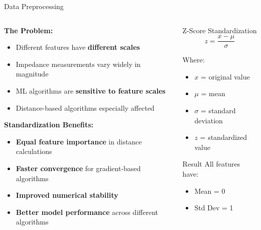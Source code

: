 \documentclass[aspectratio=169]{beamer}
\begin{document}
\begin{frame}{Data Preprocessing}
\begin{columns}
\begin{column}{0.6\textwidth}
\textbf{The Problem:}
\begin{itemize}
\item Different features have \textbf{different scales}
\item Impedance measurements vary widely in magnitude
\item ML algorithms are \textbf{sensitive to feature scales}
\item Distance-based algorithms especially affected
\end{itemize}

\vspace{0.3cm}
\textbf{Standardization Benefits:}
\begin{itemize}
\item \textbf{Equal feature importance} in distance calculations
\item \textbf{Faster convergence} for gradient-based algorithms
\item \textbf{Improved numerical stability}
\item \textbf{Better model performance} across different algorithms
\end{itemize}
\end{column}
\begin{column}{0.4\textwidth}
\begin{block}{Z-Score Standardization}
$$z = \frac{x - \mu}{\sigma}$$

Where:
\begin{itemize}
\item $x$ = original value
\item $\mu$ = mean
\item $\sigma$ = standard deviation
\item $z$ = standardized value
\end{itemize}
\end{block}

\vspace{0.2cm}
\begin{alertblock}{Result}
All features have:
\begin{itemize}
\item Mean = 0
\item Std Dev = 1
\end{itemize}
\end{alertblock}
\end{column}
\end{columns}
\end{frame}
\end{document}

